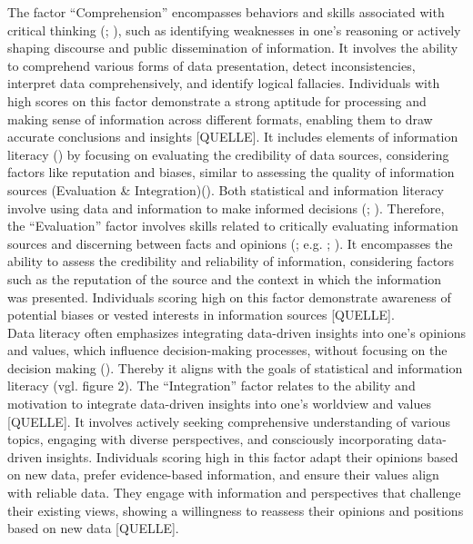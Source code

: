 \documentclass[
  12pt,
  a4paper,
  twoside]{article}
\begin{document}
The factor ``Comprehension'' encompasses behaviors and skills associated with critical thinking (; ), such as identifying weaknesses in one's reasoning or actively shaping discourse and public dissemination of information. It involves the ability to comprehend various forms of data presentation, detect inconsistencies, interpret data comprehensively, and identify logical fallacies. Individuals with high scores on this factor demonstrate a strong aptitude for processing and making sense of information across different formats, enabling them to draw accurate conclusions and insights {[}QUELLE{]}.
It includes elements of information literacy () by focusing on evaluating the credibility of data sources, considering factors like reputation and biases, similar to assessing the quality of information sources (Evaluation \& Integration)(). Both statistical and information literacy involve using data and information to make informed decisions (; ).
Therefore, the ``Evaluation'' factor involves skills related to critically evaluating information sources and discerning between facts and opinions (; e.g. ; ). It encompasses the ability to assess the credibility and reliability of information, considering factors such as the reputation of the source and the context in which the information was presented. Individuals scoring high on this factor demonstrate awareness of potential biases or vested interests in information sources {[}QUELLE{]}.\\
Data literacy often emphasizes integrating data-driven insights into one's opinions and values, which influence decision-making processes, without focusing on the decision making (). Thereby it aligns with the goals of statistical and information literacy (vgl. figure 2).
The ``Integration'' factor relates to the ability and motivation to integrate data-driven insights into one's worldview and values {[}QUELLE{]}. It involves actively seeking comprehensive understanding of various topics, engaging with diverse perspectives, and consciously incorporating data-driven insights. Individuals scoring high in this factor adapt their opinions based on new data, prefer evidence-based information, and ensure their values align with reliable data. They engage with information and perspectives that challenge their existing views, showing a willingness to reassess their opinions and positions based on new data {[}QUELLE{]}.\\
\end{document}

